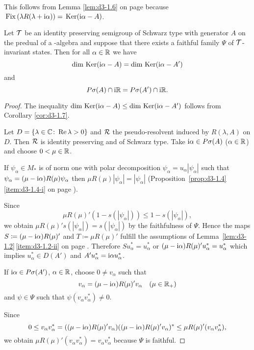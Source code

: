 This follows from Lemma \ref{lem:d3-1.6} on page \pageref{lem:d3-1.6} because $\mathop{}\mathrm{Fix}\left(\lambda R(\lambda+\mathrm{i}\alpha)\right) = \mathop{}\mathrm{Ker}(\mathrm{i}\alpha-A)$.
\begin{proposition}\label{prop:d3-1.8}
Let $\mathcal{T}$ be an identity preserving semigroup of Schwarz type with generator $A$ on the predual of a \WA-algebra and suppose that there exists a faithful family $\Psi$ of $\mathcal{T}$-invariant states.
Then for all $\alpha \in \mathbb{R}$ we have
\[
\dim \mathop{}\mathrm{Ker}(\mathrm{i}\alpha - A) = \dim \mathop{}\mathrm{Ker}(\mathrm{i}\alpha - A')
\]
and
\[
P\sigma(A) \cap \mathrm{i}\mathbb{R} = P{\sigma}(A') \cap \mathrm{i}\mathbb{R} .
\]
\end{proposition}
\begin{proof}
The inequality $\dim \mathop{}\mathrm{Ker}(\mathrm{i}\alpha - A) \leq \dim \mathop{}\mathrm{Ker}(\mathrm{i}\alpha - A')$ follows from Corollary \ref{cor:d3-1.7}.

Let $D = \{\lambda \in \mathbb{C} \colon \mathop{}\!\mathrm{Re}\,\lambda > 0\}$ and $\mathcal{R}$ the pseudo-resolvent induced by $R(\lambda,A)$ on $D$.
Then $\mathcal{R}$ is identity preserving and of Schwarz type.
Take $\mathrm{i}\alpha \in P\sigma(A)$ ($\alpha \in \mathbb{R}$) and choose $0 < \mu \in \mathbb{R}$.

If $\psi_{\alpha} \in M_{*}$ is of norm one with polar decomposition $\psi_{\alpha} = u_{\alpha}|\psi_{\alpha}|$ such that $\psi_{\alpha} = (\mu - \mathrm{i}\alpha)R(\mu)\psi_{\alpha}$ then $\mu R(\mu)|\psi_{\alpha}| = |\psi_{\alpha}|$ (Proposition~\ref{prop:d3-1.4}\,\ref{item:d3-1.4-i} on page \pageref{prop:d3-1.4}).

Since
\[
\mu R(\mu)'(1 - s(|\psi_{\alpha}|)) \leq 1 - s(|\psi_{\alpha}|) ,
\]
we obtain $\mu R(\mu)'s(|\psi_{\alpha}|) = s(|\psi_{\alpha}|)$ by the faithfulness of $\Psi$.
Hence the maps $S \coloneqq (\mu - \mathrm{i}\alpha)R(\mu)'$ and $T \coloneqq \mu R(\mu)'$ fulfill the assumptions of 
Lemma~\ref{lem:d3-1.2}\,\ref{item:d3-1.2-ii} on page \pageref{lem:d3-1.2}.
Therefore $Su_{\alpha}^{*} = u_{\alpha}^{*}$ or $(\mu-\mathrm{i}\alpha)R(\mu)'u_{\alpha}^{*} = u_{\alpha}^{*}$ which implies $u_{\alpha}^{*} \in D(A')$ and $A'u_{\alpha}^{*} = \mathrm{i}\alpha u_{\alpha}^{*}$.

If $\mathrm{i}\alpha \in P{\sigma}(A')$, $\alpha \in \mathbb{R}$, choose $0 \neq v_{\alpha}$ such that
\[
v_{\alpha} = (\mu - \mathrm{i}\alpha)R(\mu)'v_{\alpha} \quad (\mu \in \mathbb{R}_{+})
\]
and $\psi \in \Psi$ such that $\psi(v_{\alpha}v_{\alpha}^{*}) \neq 0$.

Since
\[
0 \leq v_{\alpha}v_{\alpha}^{*} = ((\mu - \mathrm{i}\alpha)R(\mu)'v_{\alpha})((\mu - \mathrm{i}\alpha)R(\mu)'v_{\alpha})^{*} \leq \mu R(\mu)'(v_{\alpha}v_{\alpha}^{*}) ,
\]
we obtain $\mu R(\mu)'(v_{\alpha}v_{\alpha}^{*}) = v_{\alpha}v_{\alpha}^{*}$ because $\Psi$ is faithful.


\end{proof}
